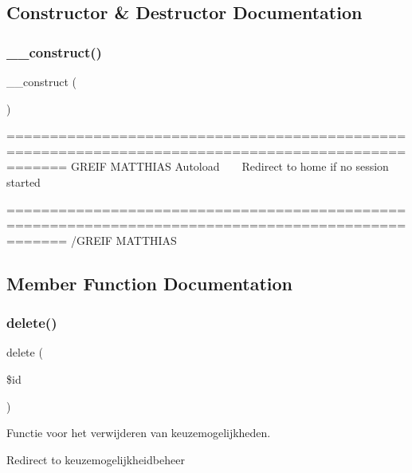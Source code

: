 \subsection{Constructor \& Destructor Documentation}
\mbox{\label{class_keuzemogelijkheid_a095c5d389db211932136b53f25f39685}} 
\subsubsection{\texorpdfstring{\+\_\+\+\_\+construct()}{\_\_construct()}}
{\footnotesize\ttfamily \+\_\+\+\_\+construct (\begin{DoxyParamCaption}{ }\end{DoxyParamCaption})}

=================================================================================================== G\+R\+E\+IF M\+A\+T\+T\+H\+I\+AS Autoload ~\newline
~\newline
 Redirect to home if no session started

=================================================================================================== /\+G\+R\+E\+IF M\+A\+T\+T\+H\+I\+AS 

\subsection{Member Function Documentation}
\mbox{\label{class_keuzemogelijkheid_a2f8258add505482d7f00ea26493a5723}} 
\subsubsection{\texorpdfstring{delete()}{delete()}}
{\footnotesize\ttfamily delete (\begin{DoxyParamCaption}\item[{}]{\$id }\end{DoxyParamCaption})}



Functie voor het verwijderen van keuzemogelijkheden. 

Redirect to keuzemogelijkheidbeheer \mbox{\label{class_keuzemogelijkheid_a50e3bfb586b2f42932a6a93f3fbb0828}} 
